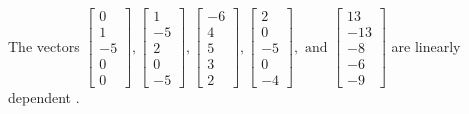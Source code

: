 \begin{exercise}
\begin{exerciseStatement}
  \end{exerciseStatement}
  \begin{exerciseAnswer}
   The vectors \(\left[\begin{array}{r}
0 \\
1 \\
-5 \\
0 \\
0
\end{array}\right] , \left[\begin{array}{r}
1 \\
-5 \\
2 \\
0 \\
-5
\end{array}\right] , \left[\begin{array}{r}
-6 \\
4 \\
5 \\
3 \\
2
\end{array}\right] , \left[\begin{array}{r}
2 \\
0 \\
-5 \\
0 \\
-4
\end{array}\right] , \text{ and } \left[\begin{array}{r}
13 \\
-13 \\
-8 \\
-6 \\
-9
\end{array}\right]\) are 
  	 linearly dependent  .
  


  \end{exerciseAnswer}
\end{exercise}